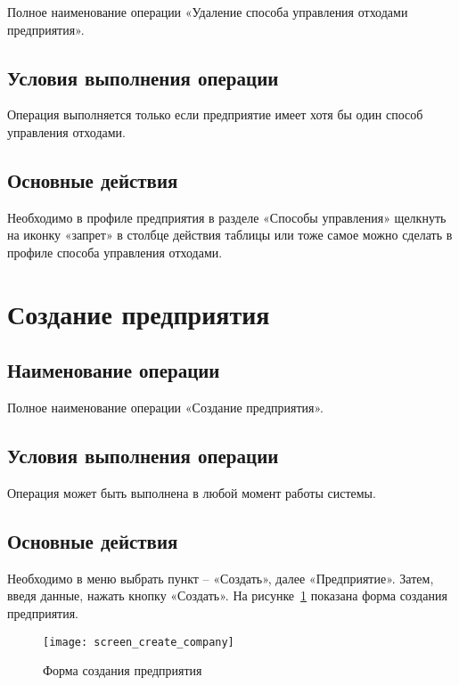 \documentclass[a4paper]{G2-105}
\begin{document}
Полное наименование операции «Удаление способа управления отходами предприятия».

\subsection{Условия выполнения операции}

Операция выполняется только если предприятие имеет хотя бы один способ управления отходами.

\subsection{Основные действия}

Необходимо в профиле предприятия в разделе «Способы управления» щелкнуть на иконку «запрет» в столбце действия таблицы или тоже самое можно сделать в профиле способа управления отходами.

\section{Создание предприятия}

\ttl

\subsection{Наименование операции}

Полное наименование операции «Создание предприятия».

\subsection{Условия выполнения операции}

Операция может быть выполнена в любой момент работы системы.

\subsection{Основные действия}

Необходимо в меню выбрать пункт -- «Создать», далее «Предприятие». Затем, введя данные, нажать кнопку «Создать». На рисунке~\ref{fig:screen_create_company} показана форма создания предприятия.

\begin{figure}[H]
\centering
\texttt{[image: screen\_create\_company]}
\caption{Форма создания предприятия}
\label{fig:screen_create_company}
\end{figure}
\end{document}
